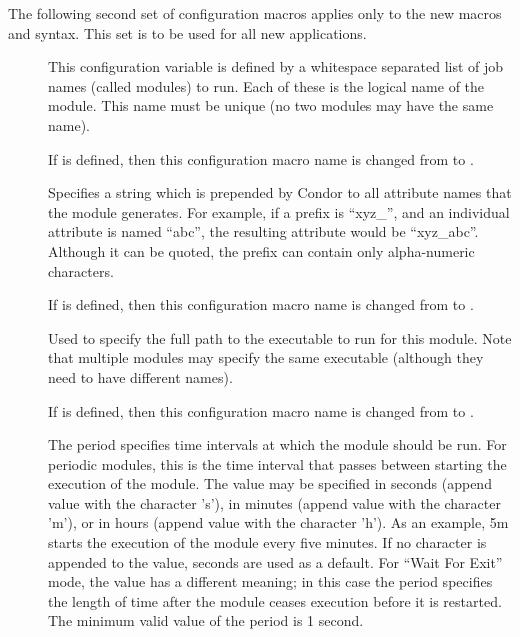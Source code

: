 The following 
second set of configuration macros applies only to the new
macros and syntax.
This set is to be used for all new applications.
\begin{description}

\item[]
\label{param:StartdCronJobList}
  This configuration variable is defined by a whitespace separated
  list of job names (called modules) to run.
  Each of these is the logical name of the module.  This name
  must be unique (no two modules may have the same name).

  If 
  is defined, then this configuration macro name is changed from
   to
  .

\item[]
\label{param:StartdCronModulePrefix}
    Specifies a string which is prepended by
    Condor to all attribute names that the module generates.  For
    example, if a prefix is ``xyz\_'', and an individual attribute is
    named ``abc'', the resulting attribute would be ``xyz\_abc''.
    Although it can be quoted, the prefix can contain only
    alpha-numeric characters.

    If 
    is defined, then this configuration macro name is changed from
     to
    .

\item[]
\label{param:StartdCronModuleExecutable}
    Used to specify the full path to the
    executable to run for this module.  Note that multiple modules may
    specify the same executable (although they need to have different
    names).

    If 
    is defined, then this configuration macro name is changed from
     to
    .

\item[]
\label{param:StartdCronModulePeriod}
    The period specifies time intervals at
    which the module should be run.
    For periodic modules, this
    is the time interval that passes between starting the execution
    of the module.
    The value may be specified in seconds (append value with the
    character 's'), in minutes (append value with the character 'm'),
    or in hours (append value with the character 'h').
    As an example, 5m starts the execution of the module every five minutes.
    If no character is appended to the value, seconds are used as a default.
    For ``Wait For Exit'' mode, the value has a different meaning; in
    this case 
    the period specifies the length of time after the module ceases execution
    before it is restarted.
    The minimum valid value of the period is 1 second.


\end{description}
